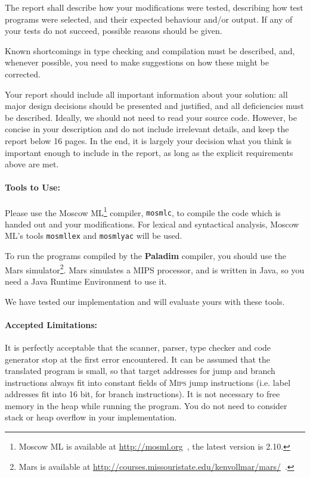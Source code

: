\documentclass[12pt,a4paper]{article}
\newcommand{\paladim}{\textbf{Paladim}\xspace}
\newcommand{\mips}{\textsc{Mips}\xspace}
\newcommand{\mars}{Mars\xspace}
\begin{document}
The report shall describe how your modifications were tested, describing
how test programs were selected, and their expected behaviour and/or output.
If any of your tests do not succeed, possible reasons should be given.

Known shortcomings in type checking and compilation must be described,
and, whenever possible, you need to make suggestions on how these might
be corrected.

Your report should include all important information about your solution:
all major design decisions should be presented and justified, and all
deficiencies must be described.  Ideally, we should not need to read your
source code.
However, be concise in your description and do not include irrelevant details,
and keep the report below 16 pages.
In the end, it is largely your decision what you think is important enough
to include in the report, as long as the explicit requirements above are met.

\paragraph{Tools to Use:}
Please use the Moscow ML\footnote{Moscow ML is available at
\url{http://mosml.org}~\cite{MoscowML}, the latest version is 2.10.} compiler,
{\tt mosmlc}, to compile the code which is handed out and your modifications.
For lexical and syntactical analysis, Moscow ML's tools
{\tt mosmllex} and {\tt mosmlyac} will be used.

\noindent
To run the programs compiled by the \paladim compiler, you should use the
\mars simulator\footnote{\mars is available at
\url{http://courses.missouristate.edu/kenvollmar/mars/}~\cite{Mars}.
}.
\mars simulates a MIPS processor, and
is written in Java, so you need a Java Runtime Environment to
use it.

\noindent
We have tested our implementation and will evaluate yours with these tools.

\paragraph{Accepted Limitations:}

It is perfectly acceptable that the scanner, parser, type checker and code
generator stop at the first error encountered.
%
It can be assumed that the translated program is small, so that target
addresses for jump and branch instructions always fit into constant fields of
\mips jump instructions (i.e. label addresses fit into 16 bit, for branch
instructions).
%
It is not necessary to free memory in the heap while running the program.
You do not need to consider stack or heap overflow in your implementation.
\end{document}
